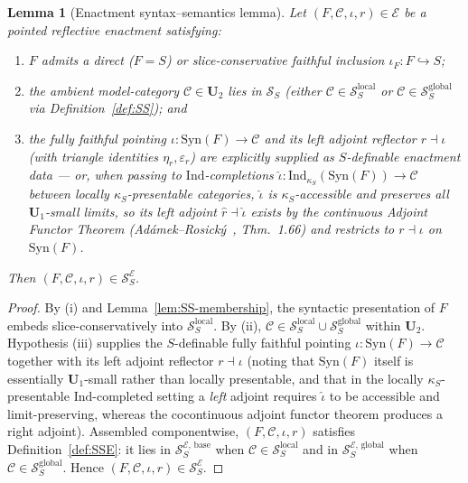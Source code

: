 \documentclass[11pt]{article}
\theoremstyle{plain}
\newtheorem{lemma}[theorem]{Lemma}
\theoremstyle{definition}
\newcommand{\cS}{\mathcal{S}}
\newcommand{\cC}{\mathcal{C}}
\newcommand{\Syn}{\mathrm{Syn}}
\newcommand{\cE}{\mathcal{E}}
\newcommand{\SSE}{\cS_{S}^{\cE}}
\newcommand{\SSEbase}{\cS_{S}^{\cE,\,\mathrm{base}}}
\newcommand{\SSEglobal}{\cS_{S}^{\cE,\,\mathrm{global}}}
\begin{document}
\begin{lemma}[Enactment syntax--semantics lemma]\label{lem:SS-membership-E}
Let $(F, \cC, \iota, r) \in \cE$ be a pointed reflective enactment satisfying:
\begin{enumerate}[nosep,label=(\roman*)]
\item $F$ admits a direct ($F = S$) or slice-conservative faithful inclusion $\iota_F : F \hookrightarrow S$;
\item the ambient model-category $\cC \in \mathbf{U}_2$ lies in $\cS_S$ (either $\cC \in \cS_S^{\mathrm{local}}$ or $\cC \in \cS_S^{\mathrm{global}}$ via Definition~\ref{def:SS}); and
\item the fully faithful pointing $\iota : \Syn(F) \to \cC$ and its left adjoint reflector $r \dashv \iota$ (with triangle identities $\eta_r, \varepsilon_r$) are explicitly supplied as $S$-definable enactment data --- or, when passing to $\mathrm{Ind}$-completions $\widehat{\iota} : \mathrm{Ind}_{\kappa_S}(\Syn(F)) \to \cC$ between locally $\kappa_S$-presentable categories, $\widehat{\iota}$ is $\kappa_S$-accessible and preserves all $\mathbf{U}_1$-small limits, so its left adjoint $\widehat{r} \dashv \widehat{\iota}$ exists by the continuous Adjoint Functor Theorem (Ad\'amek--Rosick\'y~\cite{AdamekRosicky1994}, Thm.~1.66) and restricts to $r \dashv \iota$ on $\Syn(F)$.
\end{enumerate}
Then $(F, \cC, \iota, r) \in \SSE$.
\end{lemma}

\begin{proof}
By (i) and Lemma~\ref{lem:SS-membership}, the syntactic presentation of $F$ embeds slice-conservatively into $\cS_S^{\mathrm{local}}$. By (ii), $\cC \in \cS_S^{\mathrm{local}} \cup \cS_S^{\mathrm{global}}$ within $\mathbf{U}_2$. Hypothesis (iii) supplies the $S$-definable fully faithful pointing $\iota : \Syn(F) \to \cC$ together with its left adjoint reflector $r \dashv \iota$ (noting that $\Syn(F)$ itself is essentially $\mathbf{U}_1$-small rather than locally presentable, and that in the locally $\kappa_S$-presentable $\mathrm{Ind}$-completed setting a \emph{left} adjoint requires $\widehat{\iota}$ to be accessible and limit-preserving, whereas the cocontinuous adjoint functor theorem produces a right adjoint). Assembled componentwise, $(F, \cC, \iota, r)$ satisfies Definition~\ref{def:SSE}: it lies in $\SSEbase$ when $\cC \in \cS_S^{\mathrm{local}}$ and in $\SSEglobal$ when $\cC \in \cS_S^{\mathrm{global}}$. Hence $(F, \cC, \iota, r) \in \SSE$.
\end{proof}
\end{document}
